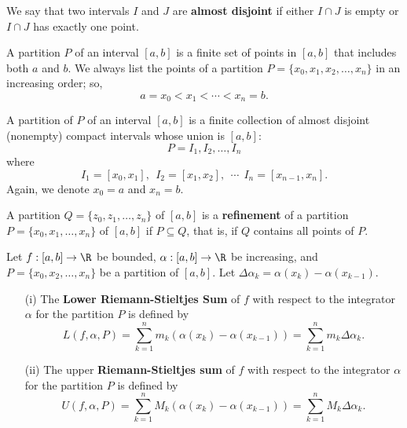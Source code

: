 \begin{definition}
    We say that two intervals \( I  \) and \( J  \) are \textbf{almost disjoint} if either \( I \cap J  \) is empty or \(  I \cap J  \) has exactly one point.
\end{definition}

\begin{definition}[Partition]
    A partition \( P  \) of an interval \( [a,b] \) is a finite set of points in \( [a,b] \) that includes both \( a  \) and \( b  \). We always list the points of a partition \( P = \{  {x}_{0} , {x}_{1}, {x}_{2}, \dots, {x}_{n} \}  \) in an increasing order; so, 
    \[  a = {x}_{0} < {x}_{1}< \cdots < {x}_{n} = b.  \]
\end{definition}

\begin{remark}
    A partition of \( P  \) of an interval \( [a,b] \) is a finite collection of almost disjoint (nonempty) compact intervals whose union is \( [a,b] \): 
    \[  P = {I}_{1}, {I}_{2}, \dots, {I}_{n} \]
    where
    \[  {I}_{1} = [{x}_{0}, {x}_{1}], \ \ {I}_{2} = [{x}_{1}, {x}_{2}], \ \ \cdots \ \ {I}_{n} = [{x}_{n-1}, {x}_{n}]. \]
    Again, we denote \( {x}_{0} = a  \) and \( {x}_{n} = b  \).
\end{remark}

\begin{definition}\label{Refinement of Partitions}
    A partition \( Q = \{ {z}_{0}, {z}_{1}, \dots, {z}_{n} \}   \) of \( [a,b] \) is a \textbf{refinement} of a partition \( P = \{ {x}_{0}, {x}_{1}, \dots, {x}_{n} \}  \) of \( [a,b] \) if \( P \subseteq   Q  \), that is, if \( Q  \) contains all points of \( P  \).
\end{definition}

\begin{definition}
    Let \( f: [a,b] \to \R  \) be bounded, \( \alpha : [a,b] \to \R  \) be increasing, and \( P = \{ {x}_{0}, {x}_{2}, \dots, {x}_{n} \}  \) be a partition of \( [a,b] \). Let \( \Delta {\alpha}_{k} = \alpha({x}_{k}) - \alpha({x}_{k-1}) \). 
    \begin{enumerate}
        \item[(i)] The \textbf{Lower Riemann-Stieltjes Sum} of \( f  \) with respect to the integrator \( \alpha \) for the partition \( P  \) is defined by 
            \[  L(f, \alpha, P ) = \sum_{ k=1  }^{ n } {m}_{k} (\alpha({x}_{k}) - \alpha({x}_{k-1})) = \sum_{ k=1  }^{ n } {m}_{k} \Delta {\alpha}_{ k }. \] 
        \item[(ii)] The upper \textbf{Riemann-Stieltjes sum} of \( f  \) with respect to the integrator \( \alpha  \) for the partition \( P  \) is defined by
            \[  U(f, \alpha, P) = \sum_{ k=1  }^{ n } {M}_{k} (\alpha({x}_{k}) - \alpha({x}_{k-1})) = \sum_{ k=1  }^{ n } {M}_{k } \Delta {\alpha}_{k }. \]
    \end{enumerate}
\end{definition}

